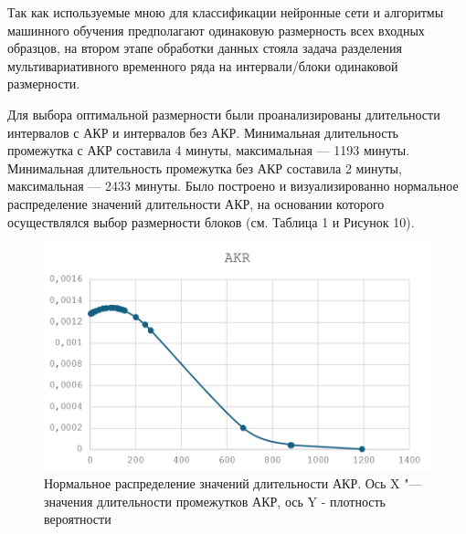 \documentclass[spec, och, diploma]{SCWorks}
\begin{document}
        Так как используемые мною для классификации нейронные сети и алгоритмы
        машинного обучения предполагают одинаковую размерность всех входных
        образцов, на втором этапе обработки данных стояла задача разделения
        мультивариативного временного ряда на интервали/блоки одинаковой
        размерности.

        Для выбора оптимальной размерности были проанализированы длительности
        интервалов с АКР и интервалов без АКР. Минимальная длительность
        промежутка с АКР составила 4 минуты, максимальная — 1193 минуты.
        Минимальная длительность промежутка без АКР составила 2 минуты,
        максимальная — 2433 минуты. Было построено и визуализированно нормальное
        распределение значений длительности АКР, на основании которого
        осуществлялся выбор размерности блоков (см. Таблица 1 и Рисунок 10).

        \begin{figure}[H]
            \centering
            \includegraphics[width=1\textwidth]{pic/dist.png}
            \caption{Нормальное распределение значений длительности АКР. Ось X "--- значения длительности промежутков АКР, ось Y - плотность вероятности}
        \end{figure}
\end{document}

